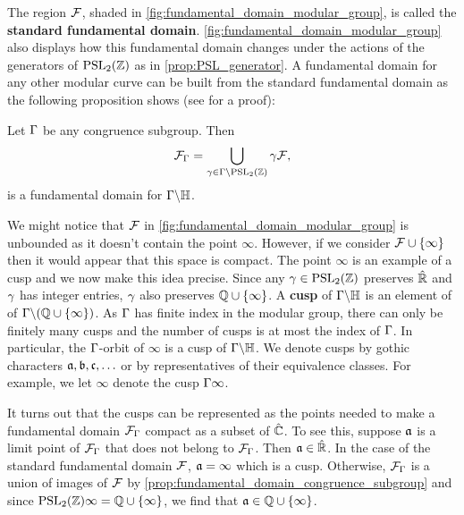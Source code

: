     The region $\mathcal{F}$, shaded in \cref{fig:fundamental_domain_modular_group}, is called the \textbf{standard fundamental domain}. \cref{fig:fundamental_domain_modular_group} also displays how this fundamental domain changes under the actions of the generators of $\mathrm{PSL}_{2}(\mathbb{Z})$ as in \cref{prop:PSL_generator}. A fundamental domain for any other modular curve can be built from the standard fundamental domain as the following proposition shows (see \cite{kilford2015modular} for a proof):

    \begin{proposition}\label{prop:fundamental_domain_congruence_subgroup}
      Let $\Gamma$ be any congruence subgroup. Then
      \[
        \mathcal{F}_{\Gamma} = \bigcup_{\gamma \in \Gamma\backslash\mathrm{PSL}_{2}(\mathbb{Z})}\gamma\mathcal{F},
      \]
      is a fundamental domain for $\Gamma\backslash\mathbb{H}$.
    \end{proposition}

    We might notice that $\mathcal{F}$ in \cref{fig:fundamental_domain_modular_group} is unbounded as it doesn't contain the point $\infty$. However, if we consider $\mathcal{F} \cup \{\infty\}$ then it would appear that this space is compact. The point $\infty$ is an example of a cusp and we now make this idea precise. Since any $\gamma \in \mathrm{PSL}_{2}(\mathbb{Z})$ preserves $\hat{\mathbb{R}}$ and $\gamma$ has integer entries, $\gamma$ also preserves $\mathbb{Q} \cup \{\infty\}$. A \textbf{cusp} of $\Gamma\backslash\mathbb{H}$ is an element of of $\Gamma\backslash(\mathbb{Q} \cup \{\infty\})$. As $\Gamma$ has finite index in the modular group, there can only be finitely many cusps and the number of cusps is at most the index of $\Gamma$. In particular, the $\Gamma$-orbit of $\infty$ is a cusp of $\Gamma\backslash\mathbb{H}$. We denote cusps by gothic characters $\mathfrak{a},\mathfrak{b},\mathfrak{c},\ldots$ or by representatives of their equivalence classes. For example, we let $\infty$ denote the cusp $\Gamma\infty$.

    \begin{remark}
      It turns out that the cusps can be represented as the points needed to make a fundamental domain $\mathcal{F}_{\Gamma}$ compact as a subset of $\hat{\mathbb{C}}$. To see this, suppose $\mathfrak{a}$ is a limit point of $\mathcal{F}_{\Gamma}$ that does not belong to $\mathcal{F}_{\Gamma}$. Then $\mathfrak{a} \in \hat{\mathbb{R}}$. In the case of the standard fundamental domain $\mathcal{F}$, $\mathfrak{a} = \infty$ which is a cusp. Otherwise, $\mathcal{F}_{\Gamma}$ is a union of images of $\mathcal{F}$ by \cref{prop:fundamental_domain_congruence_subgroup} and since $\mathrm{PSL}_{2}(\mathbb{Z})\infty = \mathbb{Q} \cup \{\infty\}$, we find that $\mathfrak{a} \in \mathbb{Q} \cup \{\infty\}$.
    \end{remark}


